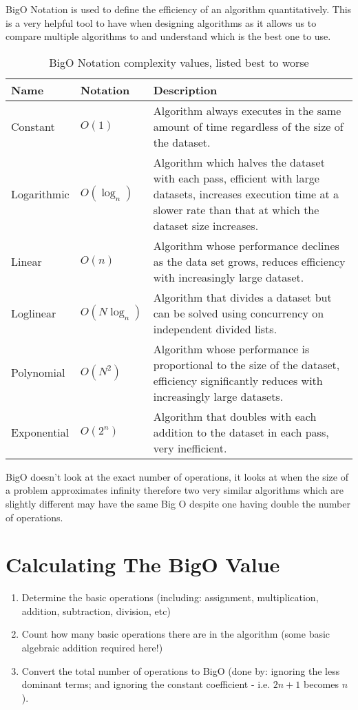 
BigO Notation is used to define the efficiency of an algorithm quantitatively. This is a very helpful tool to have when designing algorithms as it allows us to compare multiple algorithms to and understand which is the best one to use. 
\begin{table}[H]
    \centering
    {\RaggedRight
    \begin{tabular}{p{}p{}p{}}
    \textbf{Name} & \textbf{Notation} & \textbf{Description}\\
    \hline
    \hline
    Constant & $O(1)$ & Algorithm always executes in the same amount of time regardless of the size of the dataset.\\
    \hline
    Logarithmic & $O(\log_n)$ & Algorithm which halves the dataset with each pass, efficient with large datasets, increases execution time at a slower rate than that at which the dataset size increases.\\
    \hline
    Linear & $O(n)$ & Algorithm whose performance declines as the data set grows, reduces efficiency with increasingly large dataset.\\
    \hline
    Loglinear & $O(N\log_n)$ & Algorithm that divides a dataset but can be solved using concurrency on independent divided lists.\\
    \hline
    Polynomial & $O(N^2)$ & Algorithm whose performance is proportional to the size of the dataset, efficiency significantly reduces with increasingly large datasets.\\
    \hline
    Exponential & $O(2^n)$ & Algorithm that doubles with each addition to the dataset in each pass, very inefficient.\\
    \hline
    \end{tabular}
    } %
    \caption{BigO Notation complexity values, listed best to worse}
\end{table}

BigO doesn't look at the exact number of operations, it looks at when the size of a problem approximates infinity therefore two very similar algorithms which are slightly different may have the same Big O despite one having double the number of operations.

\section{Calculating The BigO Value}
\begin{enumerate}
    \item Determine the basic operations (including: assignment, multiplication, addition, subtraction, division, etc)
    \item Count how many basic operations there are in the algorithm (some basic algebraic addition required here!)
    \item Convert the total number of operations to BigO (done by: ignoring the less dominant terms; and ignoring the constant coefficient - i.e. $2n+1$ becomes $n$).
\end{enumerate}
